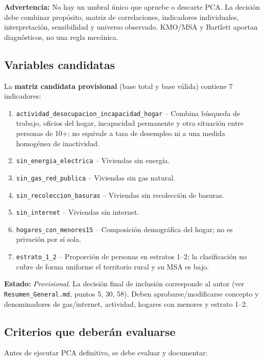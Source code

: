 \textbf{Advertencia:} No hay un umbral único que apruebe o descarte PCA. La decisión debe combinar propósito, matriz de correlaciones, indicadores individuales, interpretación, sensibilidad y universo observado. KMO/MSA y Bartlett aportan diagnósticos, no una regla mecánica.

\subsection{Variables candidatas}
\label{sec:variables_candidatas_pca}

La \textbf{matriz candidata provisional} (base total y base válida) contiene 7 indicadores:

\begin{enumerate}
    \item \texttt{actividad\_desocupacion\_incapacidad\_hogar} -- Combina búsqueda de trabajo, oficios del hogar, incapacidad permanente y otra situación entre personas de 10+; no equivale a tasa de desempleo ni a una medida homogénea de inactividad.
    \item \texttt{sin\_energia\_electrica} -- Viviendas sin energía.
    \item \texttt{sin\_gas\_red\_publica} -- Viviendas sin gas natural.
    \item \texttt{sin\_recoleccion\_basuras} -- Viviendas sin recolección de basuras.
    \item \texttt{sin\_internet} -- Viviendas sin internet.
    \item \texttt{hogares\_con\_menores15} -- Composición demográfica del hogar; no es privación por sí sola.
    \item \texttt{estrato\_1\_2} -- Proporción de personas en estratos 1--2; la clasificación no cubre de forma uniforme el territorio rural y su MSA es bajo.
\end{enumerate}

\textbf{Estado:} \textit{Provisional}. La decisión final de inclusión corresponde al autor (ver \texttt{Resumen\_General.md}, puntos 5, 30, 58). Deben aprobarse/modificarse concepto y denominadores de gas/internet, actividad, hogares con menores y estrato 1--2.

\subsection{Criterios que deberán evaluarse}
\label{sec:criterios_evaluacion_pca}

Antes de ejecutar PCA definitivo, se debe evaluar y documentar:

